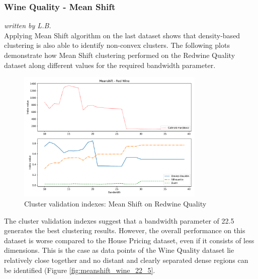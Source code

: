 \subsubsection{Wine Quality - Mean Shift}
\textit{written by L.B.}\\

Applying Mean Shift algorithm on the last dataset shows that density-based clustering is also able to identify non-convex clusters. The following plots demonstrate how Mean Shift clustering performed on the Redwine Quality dataset along different values for the required bandwidth parameter.

\begin{figure}[!ht]
\caption{Cluster validation indexes: Mean Shift on Redwine Quality}
\begin{center}
\includegraphics[width=0.8\textwidth]{images/Meanshift_-_Red_Wine.pdf}
\end{center}
\label{fig:meanshift_wine_indexes}
\end{figure}

The cluster validation indexes suggest that a bandwidth parameter of 22.5 generates the best clustering results. However, the overall performance on this dataset is worse compared to the House Pricing dataset, even if it consists of less dimensions. This is the case as data points of the Wine Quality dataset lie relatively close together and no distant and clearly separated dense regions can be identified (Figure \ref{fig:meanshift_wine_22_5}. 

